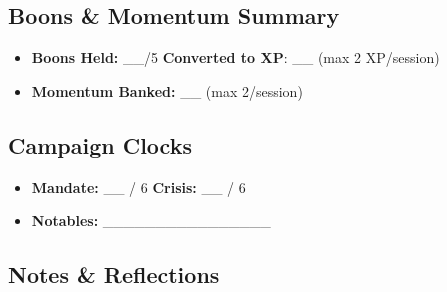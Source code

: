 \subsection{Boons \& Momentum Summary}
\begin{itemize}
  \item \textbf{Boons Held:} \_\_/5 \quad \textbf{Converted to XP}: \_\_ (max 2 XP/session)
  \item \textbf{Momentum Banked:} \_\_ (max 2/session)
\end{itemize}

\subsection{Campaign Clocks}
\begin{itemize}
  \item \textbf{Mandate:} \_\_ / 6 \qquad \textbf{Crisis:} \_\_ / 6
  \item \textbf{Notables:} \_\_\_\_\_\_\_\_\_\_\_\_\_\_\_\_
\end{itemize}

\subsection{Notes \& Reflections}
\vspace{2.5cm}